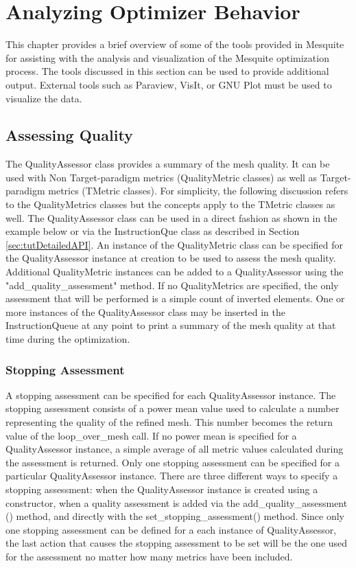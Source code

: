 \chapter{Analyzing Optimizer Behavior}

This chapter provides a brief overview of some of the tools provided in Mesquite for assisting with the analysis and visualization of the Mesquite optimization process.  The tools discussed in this section can be used to provide additional output.  External tools such as Paraview, VisIt, or GNU Plot must be used to visualize the data.

\section{Assessing Quality}

  The QualityAssessor class provides a summary of the mesh quality. It can be used with Non Target-paradigm metrics (QualityMetric classes) as well as Target-paradigm metrics (TMetric classes). For simplicity, the following discussion refers to the QualityMetrics classes but the concepts apply to the TMetric classes as well.  The QualityAssessor class can be used in a direct fashion as shown in the example below or via the InstructionQue class as described in Section \ref{sec:tutDetailedAPI}.  An instance of the QualityMetric class can be specified for the QualityAssessor instance at creation to be used to assess the mesh quality.  Additional QualityMetric instances can be added to a QualityAssessor using the "add\_quality\_assessment" method.  If no QualityMetrics are specified, the only assessment that will be performed is a simple count of inverted elements. One or more instances of the QualityAssessor class may be inserted in the InstructionQueue at any point to print a summary of the mesh quality at that time during the optimization.

\subsection{Stopping Assessment}

A stopping assessment can be specified for each QualityAssessor instance.  The stopping assessment consists of a power mean value used to calculate a number representing the quality of the refined mesh. This number becomes the return value of the loop\_over\_mesh call.  If no power mean is specified for a QualityAssessor instance, a simple average of all metric values calculated during the assessment is returned.  Only one stopping assessment can be specified for a particular QualityAssessor instance.  There are three different ways to specify a stopping assessment: when the QualityAssessor instance is created using a constructor, when a quality assessment is added via the add\_quality\_assessment () method, and directly with the set\_stopping\_assessment() method.  Since only one stopping assessment can be defined for a each instance of QualityAssessor, the last action that causes the stopping assessment to be set will be the one used for the assessment no matter how many metrics have been included.

